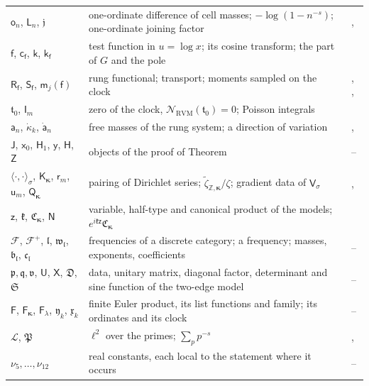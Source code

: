 \documentclass[11pt,reqno]{amsart}
\makeatletter
\let\CG@origref\ref
\let\CG@origeqref\eqref
\newcommand{\CG@gettip}[1]{\@ifundefined{CGTip@#1}{Reference: #1}{\csname CGTip@#1\endcsname}}
\DeclareRobustCommand{\CGref}[1]{\pdftooltip{\CG@origref{#1}}{\CG@gettip{#1}}}
\DeclareRobustCommand{\CGeqref}[1]{\pdftooltip{\CG@origeqref{#1}}{\CG@gettip{#1}}}
\numberwithin{equation}{section}
\theoremstyle{plain}
\theoremstyle{definition}
\theoremstyle{remark}
\newcommand{\Z}{\mathbb Z}
\newcommand{\RVM}{\mathrm{RVM}}
\newcommand{\NR}{\mathcal N_{\RVM}}
\makeatother
\begin{document}
{\begin{longtable}{>{\raggedright\arraybackslash}p{}>{\raggedright\arraybackslash}p{}>{\raggedright\arraybackslash}p{}}
$\mathsf o_n$, $\mathsf L_n$, $\mathfrak j$ & one-ordinate difference of cell masses; $-\log(1-n^{-s})$; one-ordinate joining factor & \CGeqref{eq:one-ordinate}, \CGeqref{eq:one-ordinate-joining}\\
$\mathsf f$, $\mathsf c_{\mathsf f}$, $\mathsf k$, $\mathsf k_{\mathsf f}$ & test function in $u=\log x$; its cosine transform; the part of $G$ and the pole & \CGeqref{eq:transport-defs}\\
$\mathsf R_{\mathsf f}$, $\mathsf S_{\mathsf f}$, $\mathsf m_j(\mathsf f)$ & rung functional; transport; moments sampled on the clock & \CGeqref{eq:rung-functional}, \CGeqref{eq:transport}, \CGeqref{eq:transport-moments}\\
$\mathfrak t_0$, $\mathsf I_m$ & zero of the clock, $\NR(\mathfrak t_0)=0$; Poisson integrals & \CGeqref{eq:clock-defect-poisson}\\
$\mathsf a_n$, $\dot\kappa_k$, $\dot{\mathsf a}_n$ & free masses of the rung system; a direction of variation & \CGeqref{eq:rung-system}, \CGeqref{eq:rung-linearized}\\
$\mathsf J$, $\mathsf x_0$, $\mathsf H_1$, $\mathsf y$, $\mathsf H$, $\mathsf Z$ & objects of the proof of Theorem~\CGref{thm:nondegenerate} & \CGeqref{eq:nondeg-H1}--\CGeqref{eq:nondeg-H}\\
$\langle\cdot,\cdot\rangle_\sigma$, $\mathsf K_{\boldsymbol{\kappa}}$, $\mathsf r_m$, $\mathsf u_m$, $\mathsf Q_{\boldsymbol{\kappa}}$ & pairing of Dirichlet series; $\tilde\zeta_{\Z,\boldsymbol{\kappa}}/\zeta$; gradient data of $\mathsf V_\sigma$ & \CGeqref{eq:K-kappa}, \CGeqref{eq:gradient}\\
$\mathsf z$, $\mathfrak k$, $\mathfrak C_{\boldsymbol{\kappa}}$, $\mathsf N$ & variable, half-type and canonical product of the models; $e^{i\mathfrak k\mathsf z}\mathfrak C_{\boldsymbol{\kappa}}$ & \CGeqref{eq:model-product}\\
$\mathscr F$, $\mathscr F^{+}$, $\mathfrak l$, $\mathfrak w_{\mathfrak l}$, $\mathfrak b_{\mathfrak l}$, $\mathfrak c_{\mathfrak l}$ & frequencies of a discrete category; a frequency; masses, exponents, coefficients & \CGeqref{eq:acceptance-density}--\CGeqref{eq:acceptance-window}\\
$\mathfrak p,\mathfrak q,\mathfrak v$, $\mathsf U$, $\mathsf X$, $\mathfrak D$, $\mathfrak S$ & data, unitary matrix, diagonal factor, determinant and sine function of the two-edge model & \CGeqref{eq:graph-matrices}--\CGeqref{eq:graph-sine}\\
$\mathsf F$, $\mathsf F_{\boldsymbol{\kappa}}$, $\mathsf F_\lambda$, $\mathfrak y_k$, $\mathfrak x_k$ & finite Euler product, its list functions and family; its ordinates and its clock & \CGeqref{eq:finite-euler}--\CGeqref{eq:finite-euler-list}\\
$\mathscr L$, $\mathfrak P$ & $\ell^2$ over the primes; $\sum_pp^{-s}$ & \CGeqref{eq:prime-det}, \CGeqref{eq:prime-det2}\\
$\nu_5,\dots,\nu_{12}$ & real constants, each local to the statement where it occurs & --\\
\end{longtable}
}
\end{document}
